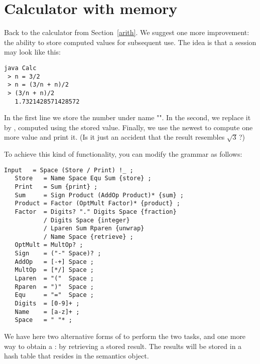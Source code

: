 \newpage

\section{Calculator with memory\label{calc}}


Back to the calculator from Section~\ref{arith}.
We suggest one more improvement:
the ability to store computed values for subsequent use.
The idea is that  
a session may look like this:

\small
\begin{Verbatim}[samepage=true,xleftmargin=15mm,baselinestretch=0.8]
 java Calc
 > n = 3/2
 > n = (3/n + n)/2
 > (3/n + n)/2
   1.7321428571428572
\end{Verbatim}
\normalsize

In the first line we store the number  under name "".
In the second, we replace it by , computed using the stored value.
Finally, we use the newest  to compute one more value and print it.
(Is it just an accident that the result resembles $\sqrt{3}$\,?)

To achieve this kind of functionality, you can modify the grammar as follows:

\small
\begin{Verbatim}[frame=single,framesep=2mm,samepage=true,xleftmargin=15mm,xrightmargin=15mm,baselinestretch=0.8]
   Input   = Space (Store / Print) !_ ;
   Store   = Name Space Equ Sum {store} ;
   Print   = Sum {print} ;
   Sum     = Sign Product (AddOp Product)* {sum} ;
   Product = Factor (OptMult Factor)* {product} ;
   Factor  = Digits? "." Digits Space {fraction}
           / Digits Space {integer}
           / Lparen Sum Rparen {unwrap} 
           / Name Space {retrieve} ; 
   OptMult = MultOp? ;
   Sign    = ("-" Space)? ;
   AddOp   = [-+] Space ;
   MultOp  = [*/] Space ;
   Lparen  = "("  Space ;
   Rparen  = ")"  Space ;
   Equ     = "="  Space ;
   Digits  = [0-9]+ ;
   Name    = [a-z]+ ;
   Space   = " "* ;
\end{Verbatim}
\normalsize

We have here two alternative forms of 
to perform the two tasks,
and one more way to obtain a : 
by retrieving a stored result.
The results will be stored in a hash table 
that resides in the semantics object.


